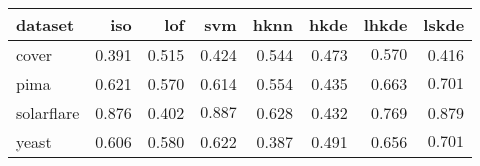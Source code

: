 \begin{tabular}{l|rrr|rrrr}
  \toprule
dataset & iso & lof & svm & hknn & hkde & lhkde & lskde \\ 
  \midrule
    cover & 0.391 & 0.515 & 0.424 & 0.544 & 0.473 & $\bm{0.570}$ & 0.416 \\ 
    pima & 0.621 & 0.570 & 0.614 & 0.554 & 0.435 & 0.663 & $\bm{0.701}$ \\ 
    solarflare & 0.876 & 0.402 & $\bm{0.887}$ & 0.628 & 0.432 & 0.769 & 0.879 \\ 
    yeast & 0.606 & 0.580 & 0.622 & 0.387 & 0.491 & 0.656 & $\bm{0.701}$ \\ 
   \bottomrule
\end{tabular}
